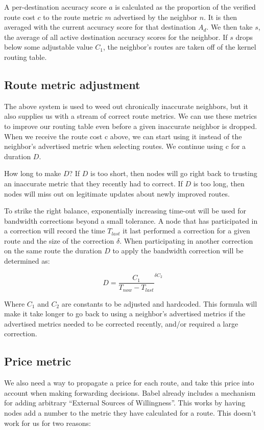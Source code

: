 \documentclass[11pt]{article}
\begin{document}
A per-destination accuracy score $a$ is calculated as the proportion of the verified route cost $c$ to the route metric $m$ advertised by the neighbor $n$. It is then averaged with the current accuracy score for that destination $A_d$. We then take $s$, the average of all active destination accuracy scores for the neighbor. If $s$ drops below some adjustable value $C_1$, the neighbor’s routes are taken off of the kernel routing table.

\subsection{Route metric adjustment}
\label{sec:adjustment}
The above system is used to weed out chronically inaccurate neighbors, but it also supplies us with a stream of correct route metrics. We can use these metrics to improve our routing table even before a given inaccurate neighbor is dropped. When we receive the route cost c above, we can start using it instead of the neighbor’s advertised metric when selecting routes. We continue using c for a duration $D$.
 
How long to make $D$? If $D$ is too short, then nodes will go right back to trusting an inaccurate metric that they recently had to correct. If $D$ is too long, then nodes will miss out on legitimate updates about newly improved routes.
					
To strike the right balance, exponentially increasing time-out will be used for bandwidth corrections beyond a small tolerance. A node that has participated in a correction will record the time $T_{last}$ it last performed a correction for a given route and the size of the correction $\delta$. When participating in another correction on the same route the duration $D$ to apply the bandwidth correction will be determined as:

\[
D = \frac{C_1}{T_{now} - T_{last}}^{\delta C_2}
\]

Where $C_1$ and $C_2$ are constants to be adjusted and hardcoded. This formula will make it take longer to go back to using a neighbor’s advertised metrics if the advertised metrics needed to be corrected recently, and/or required a large correction.

\subsection{Price metric}
We also need a way to propagate a price for each route, and take this price into account when making forwarding decisions. Babel already includes a mechanism for adding arbitrary ``External Sources of Willingness''. This works by having nodes add a number to the metric they have calculated for a route. This doesn’t work for us for two reasons: 
\end{document}
